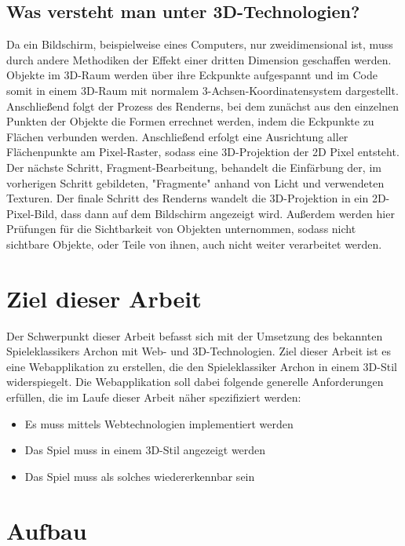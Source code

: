 \subsection{Was versteht man unter 3D-Technologien?}
Da ein Bildschirm, beispielweise eines Computers, nur zweidimensional ist, muss durch andere Methodiken der Effekt einer dritten Dimension geschaffen werden.\\Objekte im 3D-Raum werden über ihre Eckpunkte aufgespannt und im Code somit in einem 3D-Raum mit normalem 3-Achsen-Koordinatensystem dargestellt. Anschließend folgt der Prozess des Renderns, bei dem zunächst aus den einzelnen Punkten der Objekte die Formen errechnet werden, indem die Eckpunkte zu Flächen verbunden werden. Anschließend erfolgt eine Ausrichtung aller Flächenpunkte am Pixel-Raster, sodass eine 3D-Projektion der 2D Pixel entsteht. Der nächste Schritt, Fragment-Bearbeitung, behandelt die Einfärbung der, im vorherigen Schritt gebildeten, "Fragmente" anhand von Licht und verwendeten Texturen. Der finale Schritt des Renderns wandelt die 3D-Projektion in ein 2D-Pixel-Bild, dass dann auf dem Bildschirm angezeigt wird. Außerdem werden hier Prüfungen für die Sichtbarkeit von Objekten unternommen, sodass nicht sichtbare Objekte, oder Teile von ihnen, auch nicht weiter verarbeitet werden.

\section{Ziel dieser Arbeit}
\label{sec:ziel_dieser_arbeit}
Der Schwerpunkt dieser Arbeit befasst sich mit der Umsetzung des bekannten Spieleklassikers Archon mit Web- und 3D-Technologien.
Ziel dieser Arbeit ist es eine Webapplikation zu erstellen, die den Spieleklassiker Archon in einem 3D-Stil widerspiegelt.
Die Webapplikation soll dabei folgende generelle Anforderungen erfüllen, die im Laufe dieser Arbeit näher spezifiziert werden:
\begin{itemize}
	\item Es muss mittels Webtechnologien implementiert werden
	\item Das Spiel muss in einem 3D-Stil angezeigt werden
	\item Das Spiel muss als solches wiedererkennbar sein
\end{itemize}

\section{Aufbau}
\label{sec:aufbau}

